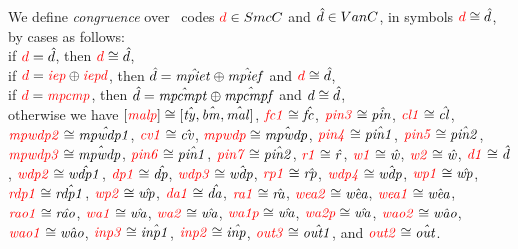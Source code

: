 \begin{definition}[$\RT\code \cong \codeV$]
\label{Def: code cong}
We define \emph{congruence} over \piccoC\ codes $\textcolor{red}{d} \in SmcC$ and $\hat{d} \in VanC$, in symbols $\RT\code \cong \codeV$, by cases as follows: 
\\ if $\textcolor{red}{d} = \hat{d}$, then $\RT\code \cong \codeV$, 
\\ if $\textcolor{red}{d} = \textcolor{red}{\mathit{iep}} \oplus \textcolor{red}{\mathit{iepd}}$, then $\hat{d} = \mathit{\hat{mpiet}} \oplus \mathit{\hat{mpief}}$ and $\RT\code \cong \codeV$, 
\\ if $\textcolor{red}{d} = \textcolor{red}{\mathit{mpcmp}}$, then $\hat{d} = \mathit{\hat{mpcmpt}} \oplus \mathit{\hat{mpcmpf}}$ and $d \cong \hat{d}$, 
\\ otherwise we have 
$[\textcolor{red}{\mathit{malp}}] \cong [\mathit{\hat{ty}}, \mathit{\hat{bm}}, \mathit{\hat{mal}}]$, 
$\textcolor{red}{\mathit{fc1}} \cong \mathit{\hat{fc}}$, $\textcolor{red}{\mathit{pin3}} \cong \mathit{\hat{pin}}$, 
$\textcolor{red}{\mathit{cl1}} \cong \mathit{\hat{cl}}$, $\textcolor{red}{\mathit{mpwdp2}} \cong \mathit{\hat{mpwdp1}}$, 
$\textcolor{red}{\mathit{cv1}} \cong \mathit{\hat{cv}}$, $\textcolor{red}{\mathit{mpwdp}} \cong \mathit{\hat{mpwdp}}$, 
$\textcolor{red}{\mathit{pin4}} \cong \mathit{\hat{pin1}}$, $\textcolor{red}{\mathit{pin5}} \cong \mathit{\hat{pin2}}$, 
$\textcolor{red}{\mathit{mpwdp3}} \cong \mathit{\hat{mpwdp}}$, $\textcolor{red}{\mathit{pin6}} \cong \mathit{\hat{pin1}}$, 
$\textcolor{red}{\mathit{pin7}} \cong \mathit{\hat{pin2}}$, $\textcolor{red}{\mathit{r1}} \cong \mathit{\hat{r}}$, 
$\textcolor{red}{\mathit{w1}} \cong \mathit{\hat{w}}$, $\textcolor{red}{\mathit{w2}} \cong \mathit{\hat{w}}$, 
$\textcolor{red}{\mathit{d1}} \cong \mathit{\hat{d}}$, $\textcolor{red}{\mathit{wdp2}} \cong \mathit{\hat{wdp1}}$, 
$\textcolor{red}{\mathit{dp1}} \cong \mathit{\hat{dp}}$, $\textcolor{red}{\mathit{wdp3}} \cong \mathit{\hat{wdp}}$, 
$\textcolor{red}{\mathit{rp1}} \cong \mathit{\hat{rp}}$, $\textcolor{red}{\mathit{wdp4}} \cong \mathit{\hat{wdp}}$, 
$\textcolor{red}{\mathit{wp1}} \cong \mathit{\hat{wp}}$, $\textcolor{red}{\mathit{rdp1}} \cong \mathit{\hat{rdp1}}$, 
$\textcolor{red}{\mathit{wp2}} \cong \mathit{\hat{wp}}$, $\textcolor{red}{\mathit{da1}} \cong \mathit{\hat{da}}$, 
$\textcolor{red}{\mathit{ra1}} \cong \mathit{\hat{ra}}$, $\textcolor{red}{\mathit{wea2}} \cong \mathit{\hat{wea}}$, 
$\textcolor{red}{\mathit{wea1}} \cong \mathit{\hat{wea}}$, $\textcolor{red}{\mathit{rao1}} \cong \mathit{\hat{rao}}$, 
$\textcolor{red}{\mathit{wa1}} \cong \mathit{\hat{wa}}$, $\textcolor{red}{\mathit{wa2}} \cong \mathit{\hat{wa}}$, 
$\textcolor{red}{\mathit{wa1p}} \cong \mathit{\hat{wa}}$, $\textcolor{red}{\mathit{wa2p}} \cong \mathit{\hat{wa}}$, 
$\textcolor{red}{\mathit{wao2}} \cong \mathit{\hat{wao}}$, $\textcolor{red}{\mathit{wao1}} \cong \mathit{\hat{wao}}$, 
$\textcolor{red}{\mathit{inp3}} \cong \mathit{\hat{inp1}}$, $\textcolor{red}{\mathit{inp2}} \cong \mathit{\hat{inp}}$, 
$\textcolor{red}{\mathit{out3}} \cong \mathit{\hat{out1}}$, and $\textcolor{red}{\mathit{out2}} \cong \mathit{\hat{out}}$. 
\end{definition}








